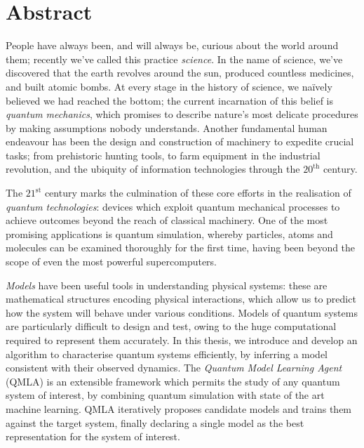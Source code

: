 \chapter*{Abstract}

People have always been, and will always be, curious about the world around them;
    recently we've called this practice \emph{science}. 
In the name of science, we've discovered that the earth revolves around the sun, 
    produced countless medicines, and built atomic bombs.
At every stage in the history of science, we na\"ively believed we had reached the bottom;
    the current incarnation of this belief is \emph{quantum mechanics},
    which promises to describe nature's most delicate procedures by making assumptions nobody understands. 
Another fundamental human endeavour has been the design and construction of machinery to expedite crucial tasks;
    from prehistoric hunting tools, to farm equipment in the industrial revolution, 
    and the ubiquity of information technologies through  the $20^{\textrm{th}}$ century. 

\par 
The $21^{\textrm{st}}$ century marks the culmination of these core efforts in the realisation of \emph{quantum technologies}:
    devices which exploit quantum mechanical processes to achieve outcomes beyond the reach of classical machinery.
One of the most promising applications is quantum simulation, 
    whereby particles, atoms and molecules can be examined thoroughly for the first time, 
    having been beyond the scope of even the most powerful supercomputers. 
\par 
\emph{Models} have been useful tools in understanding physical systems:
    these are mathematical structures encoding physical interactions,
    which allow us to predict how the system will behave under various conditions. 
Models of quantum systems are particularly difficult to design and test, 
    owing to the huge computational required to represent them accurately.
In this thesis, we introduce and develop an algorithm to characterise quantum systems efficiently, 
    by inferring a model consistent with their observed dynamics.
The \emph{Quantum Model Learning Agent} (QMLA) is an extensible framework which permits 
    the study of any quantum system of interest, 
    by combining quantum simulation with state of the art machine learning.
QMLA iteratively proposes candidate models and trains them against the target system,
    finally declaring a single model as the best representation for the system of interest.  
\par 


